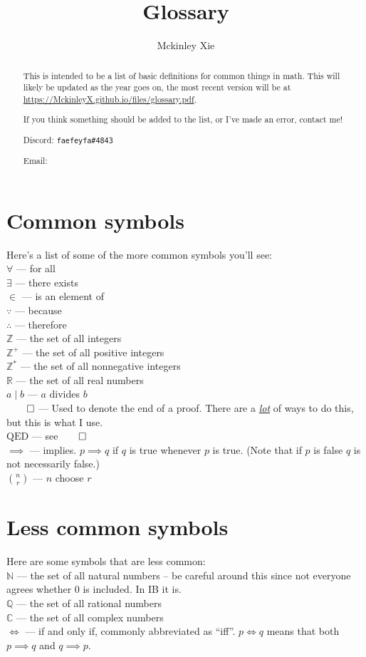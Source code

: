 \documentclass[a4paper]{scrartcl}
\title{Glossary}
\author{Mckinley Xie}
\newcommand{\term}[2]{\\$#1$  ---  #2}
\begin{document}
\maketitle
\begin{abstract}
	This is intended to be a list of basic definitions for common things in math. This will likely be updated as the year goes on, the most recent version will be at \url{https://MckinleyX.github.io/files/glossary.pdf}.

	If you think something should be added to the list, or I've made an error, contact me!

	Discord: \texttt{faefeyfa\#4843}

	Email: 
\end{abstract}
\section{Common symbols}
Here's a list of some of the more common symbols you'll see:
	\term{\forall}{for all} 
	\term{\exists}{there exists} 
	\term{\in}{is an element of}
	\term{\because}{because}
	\term{\therefore}{therefore}
	\term{\mathbb{Z}}{the set of all integers}
	\term{\mathbb{Z}^+}{the set of all positive integers}
	\term{\mathbb{Z}^*}{the set of all nonnegative integers}
	\term{\mathbb{R}}{the set of all real numbers}
	\term{a \mid b}{$a$ divides $b$}
	\term{\qed}{Used to denote the end of a proof. There are a \href{https://mathwithbaddrawings.com/2019/10/02/how-to-end-a-proof/}{\emph{lot}} of ways to do this, but this is what I use.}
	\term{\text{QED}}{see$\qed$}
	\term{\implies}{implies. $p \implies q$ if $q$ is true whenever $p$ is true. (Note that if $p$ is false $q$ is not necessarily false.)}
	\term{\binom{n}{r}}{$n$ choose $r$}
\section{Less common symbols}
Here are some symbols that are less common:
	\term{\mathbb{N}}{the set of all natural numbers -- be careful around this since not everyone agrees whether 0 is included. In IB it is.}
	\term{\mathbb{Q}}{the set of all rational numbers}
	\term{\mathbb{C}}{the set of all complex numbers}
	\term{\iff}{if and only if, commonly abbreviated as ``iff''. $p \iff q$ means that both $p \implies q$ and $q \implies p$.}
\end{document}
